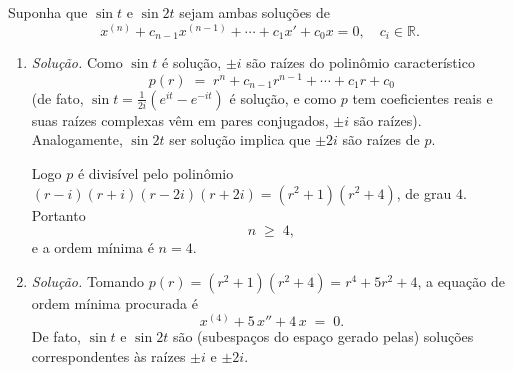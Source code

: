 \documentclass[10pt,a4paper]{amsart}
\newcommand{\R}{\mathbb{R}}
\begin{document}
 Suponha que $\sin t$ e $\sin 2t$ sejam ambas soluções de
\[
    x^{(n)} + c_{n-1} x^{(n-1)} + \cdots + c_1 x' + c_0 x = 0, \quad c_i \in \R.
\]
\begin{enumerate}[label=(\alph*)]
    \item \emph{Solução.} Como $\sin t$ é solução, $\pm i$ são raízes do polinômio característico
    \[
        p(r) \;=\; r^n + c_{n-1} r^{n-1} + \cdots + c_1 r + c_0
    \]
    (de fato, $\sin t = \tfrac{1}{2 i}(e^{i t} - e^{-i t})$ é solução, e como $p$ tem coeficientes reais e suas raízes complexas vêm em pares conjugados, $\pm i$ são raízes). Analogamente, $\sin 2t$ ser solução implica que $\pm 2 i$ são raízes de $p$.

    Logo $p$ é divisível pelo polinômio $(r - i)(r + i)(r - 2i)(r + 2i) = (r^2 + 1)(r^2 + 4)$, de grau $4$. Portanto
    \[
        n \;\geq\; 4,
    \]
    e a ordem mínima é $n = 4$.

    \item \emph{Solução.} Tomando $p(r) = (r^2 + 1)(r^2 + 4) = r^4 + 5 r^2 + 4$, a equação de ordem mínima procurada é
    \[
        x^{(4)} + 5\, x'' + 4\, x \;=\; 0.
    \]
    De fato, $\sin t$ e $\sin 2t$ são (subespaços do espaço gerado pelas) soluções correspondentes às raízes $\pm i$ e $\pm 2 i$.
\end{enumerate}

\vspace{5mm}
\end{document}
